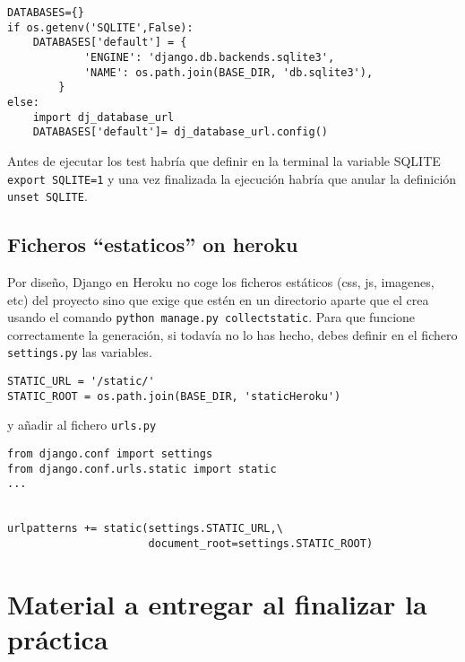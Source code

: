 \documentclass[12pt]{article} %
\begin{document}
\begin{verbatim}
DATABASES={}
if os.getenv('SQLITE',False):
    DATABASES['default'] = {
            'ENGINE': 'django.db.backends.sqlite3',
            'NAME': os.path.join(BASE_DIR, 'db.sqlite3'),
        }
else:
    import dj_database_url
    DATABASES['default']= dj_database_url.config()
\end{verbatim}

Antes de ejecutar los test habría que definir en la terminal la variable SQLITE \texttt{export SQLITE=1} y una vez finalizada la ejecución habría que anular la definición \texttt{unset SQLITE}. 

\subsection{Ficheros ``estaticos''  on heroku}
Por diseño, Django en Heroku no coge los ficheros estáticos (css, js, imagenes, etc) del proyecto sino que exige que estén en un directorio aparte que el crea usando el comando \texttt{python manage.py collectstatic}. Para que funcione correctamente la generación, si todavía no lo has hecho, debes definir en el fichero \texttt{settings.py} las variables.

\begin{verbatim}
STATIC_URL = '/static/'
STATIC_ROOT = os.path.join(BASE_DIR, 'staticHeroku')
\end{verbatim}

y añadir al fichero \texttt{urls.py}
\begin{verbatim}
from django.conf import settings
from django.conf.urls.static import static
...


urlpatterns += static(settings.STATIC_URL,\
                      document_root=settings.STATIC_ROOT)

\end{verbatim}

\section{Material a entregar al finalizar la práctica} %
\end{document}
